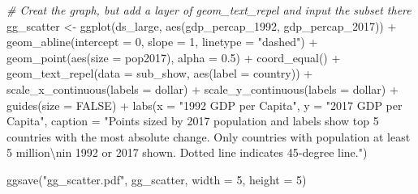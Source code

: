 \documentclass[11pt]{article}
\newenvironment{Shaded}{\begin{snugshade}}{\end{snugshade}}
\newcommand{\AttributeTok}[1]{\textcolor[rgb]{0.77,0.63,0.00}{#1}}
\newcommand{\CommentTok}[1]{\textcolor[rgb]{0.56,0.35,0.01}{\textit{#1}}}
\newcommand{\ConstantTok}[1]{\textcolor[rgb]{0.00,0.00,0.00}{#1}}
\newcommand{\DecValTok}[1]{\textcolor[rgb]{0.00,0.00,0.81}{#1}}
\newcommand{\FloatTok}[1]{\textcolor[rgb]{0.00,0.00,0.81}{#1}}
\newcommand{\FunctionTok}[1]{\textcolor[rgb]{0.00,0.00,0.00}{#1}}
\newcommand{\NormalTok}[1]{#1}
\newcommand{\OtherTok}[1]{\textcolor[rgb]{0.56,0.35,0.01}{#1}}
\newcommand{\SpecialCharTok}[1]{\textcolor[rgb]{0.00,0.00,0.00}{#1}}
\newcommand{\StringTok}[1]{\textcolor[rgb]{0.31,0.60,0.02}{#1}}
\begin{document}
\begin{Shaded}
\begin{Highlighting}[]
\CommentTok{\# Creat the graph, but add a layer of geom\_text\_repel and input the subset there }
\NormalTok{gg\_scatter }\OtherTok{\textless{}{-}} \FunctionTok{ggplot}\NormalTok{(ds\_large, }\FunctionTok{aes}\NormalTok{(gdp\_percap\_1992, gdp\_percap\_2017)) }\SpecialCharTok{+}
  \FunctionTok{geom\_abline}\NormalTok{(}\AttributeTok{intercept =} \DecValTok{0}\NormalTok{, }\AttributeTok{slope =} \DecValTok{1}\NormalTok{, }\AttributeTok{linetype =} \StringTok{"dashed"}\NormalTok{) }\SpecialCharTok{+}
  \FunctionTok{geom\_point}\NormalTok{(}\FunctionTok{aes}\NormalTok{(}\AttributeTok{size =}\NormalTok{ pop2017), }\AttributeTok{alpha =} \FloatTok{0.5}\NormalTok{) }\SpecialCharTok{+}
  \FunctionTok{coord\_equal}\NormalTok{() }\SpecialCharTok{+}
  \FunctionTok{geom\_text\_repel}\NormalTok{(}\AttributeTok{data =}\NormalTok{ sub\_show, }\FunctionTok{aes}\NormalTok{(}\AttributeTok{label =}\NormalTok{ country)) }\SpecialCharTok{+}
  \FunctionTok{scale\_x\_continuous}\NormalTok{(}\AttributeTok{labels =}\NormalTok{ dollar) }\SpecialCharTok{+}
  \FunctionTok{scale\_y\_continuous}\NormalTok{(}\AttributeTok{labels =}\NormalTok{ dollar) }\SpecialCharTok{+}
  \FunctionTok{guides}\NormalTok{(}\AttributeTok{size =} \ConstantTok{FALSE}\NormalTok{) }\SpecialCharTok{+}
  \FunctionTok{labs}\NormalTok{(}\AttributeTok{x =} \StringTok{"1992 GDP per Capita"}\NormalTok{,}
       \AttributeTok{y =} \StringTok{"2017 GDP per Capita"}\NormalTok{,}
       \AttributeTok{caption =} \StringTok{"Points sized by 2017 population and labels show top 5 countries}
\StringTok{       with the most absolute change. Only countries with population at least 5 million}\SpecialCharTok{\textbackslash{}n}\StringTok{in 1992 or 2017 shown. Dotted line indicates 45{-}degree line."}\NormalTok{)}

\FunctionTok{ggsave}\NormalTok{(}\StringTok{"gg\_scatter.pdf"}\NormalTok{, gg\_scatter, }\AttributeTok{width =} \DecValTok{5}\NormalTok{, }\AttributeTok{height =} \DecValTok{5}\NormalTok{)}
\end{Highlighting}
\end{Shaded}
\end{document}
